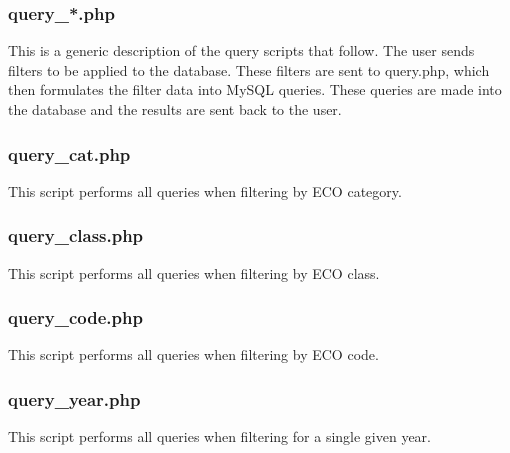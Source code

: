 \documentclass{article}
\begin{document}
\subsubsection{query\_*.php}
This is a generic description of the query scripts that follow. The user
sends filters to be applied to the database.  These filters are sent to
query.php, which then formulates the filter data into MySQL queries.
These queries are made into the database and the results are sent back to
the user.

\subsubsection{query\_cat.php}
This script performs all queries when filtering by ECO category.

\subsubsection{query\_class.php}
This script performs all queries when filtering by ECO class.

\subsubsection{query\_code.php}
This script performs all queries when filtering by ECO code.

\subsubsection{query\_year.php}
This script performs all queries when filtering for a single given year.
\end{document}
